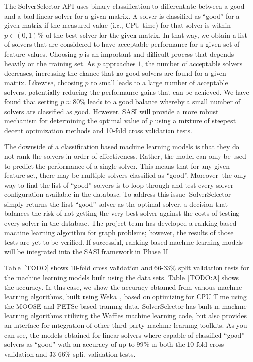 The SolverSelector API uses binary classification to differentiate between a good and a bad linear solver for a given matrix. A solver is classified as ``good'' for a given matrix if the measured value (i.e., CPU time) for that solver is within $p \in (0,1)\%$ of the best solver for the given matrix. In that way, we obtain a list of solvers that are considered to have acceptable performance for a given set of feature values. Choosing $p$ is an important and difficult process that depends heavily on the training set. As $p$ approaches $1$, the number of acceptable solvers decreases, increasing the chance that no good solvers are found for a given matrix. Likewise, choosing $p$ to small leads to a large number of acceptable solvers, potentially reducing the performance gains that can be achieved. We have found that setting $p\approx 80\%$ leads to a good balance whereby a small number of solvers are classified as good. However, SASI will provide a more robust mechanism for determining the optimal value of $p$ using a mixture of steepest decent optimization methods and 10-fold cross validation tests. 

The downside of a classification based machine learning models is that they do not rank the solvers in order of effectiveness. Rather, the model can only be used to predict the performance of a single solver. This means that for any given feature set, there may be multiple solvers classified as ``good''. Moreover, the only way to find the list of ``good'' solvers is to loop through and test every solver configuration available in the database. To address this issue, SolverSelector simply returns the first ``good'' solver as the optimal solver, a decision that balances the risk of not getting the very best solver against the costs of testing every solver in the database. The project team has developed a ranking based machine learning algorithm for graph problems; however, the results of those tests are yet to be verified. If successful, ranking based machine learning models will be integrated into the SASI framework in Phase II. 

Table~\ref{TODO} shows 10-fold cross validation and 66-33\% split validation tests for the machine learning models built using the data sets. Table~\ref{TODO:A} shows the accuracy. In this case, we show the accuracy obtained from various machine learning algorithms, built using Weka~\cite{Weka}, based on optimizing for CPU Time using the MOOSE and PETSc based training data. SolverSelector has built in machine learning algorithms utilizing the Waffles machine learning code, but also provides an interface for integration of other third party machine learning toolkits. As you can see, the models obtained for linear solvers where capable of classified ``good'' solvers as ``good'' with an accuracy of up to $99\%$ in both the 10-fold cross validation and 33-66\% split validation tests. 

